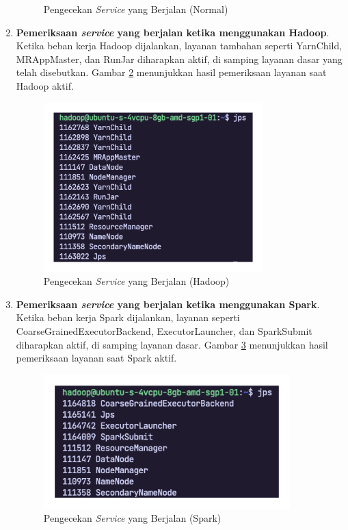 \begin{enumerate}
\begin{figure}[h]
		    \caption{Pengecekan \textit{Service} yang Berjalan (Normal)}
		    \label{fig:service-dasar}
		\end{figure}
	\item \textbf{Pemeriksaan \textit{service} yang berjalan ketika menggunakan Hadoop}. Ketika beban kerja Hadoop dijalankan, layanan tambahan seperti YarnChild, MRAppMaster, dan RunJar  diharapkan aktif, di samping layanan dasar yang telah disebutkan. Gambar \ref{fig:service-hadoop} menunjukkan hasil pemeriksaan layanan saat Hadoop aktif.
		\begin{figure}[h]
		    \centering
		    \includegraphics[width=0.8\textwidth]{figures/ch04/service-hadoop}
		    \caption{Pengecekan \textit{Service} yang Berjalan (Hadoop)}
		    \label{fig:service-hadoop}
		\end{figure}
	\item \textbf{Pemeriksaan \textit{service} yang berjalan ketika menggunakan Spark}. Ketika beban kerja Spark dijalankan, layanan seperti CoarseGrainedExecutorBackend, ExecutorLauncher, dan SparkSubmit diharapkan aktif, di samping layanan dasar.  Gambar \ref{fig:service-spark} menunjukkan hasil pemeriksaan layanan saat Spark aktif.
		\begin{figure}[h]
		    \centering
		    \includegraphics[width=0.9\textwidth]{figures/ch04/service-spark}
		    \caption{Pengecekan \textit{Service} yang Berjalan (Spark)}
		    \label{fig:service-spark}
		\end{figure}
\end{enumerate}

